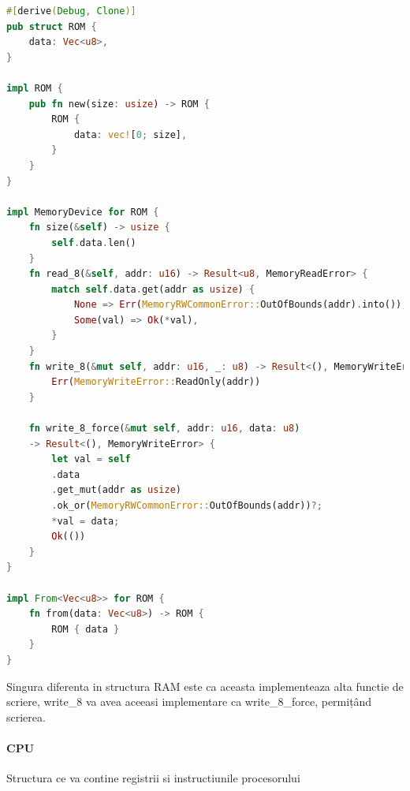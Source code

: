 \documentclass[titlepage,12pt]{article}
\DeclareRobustCommand{\code}[1]{{\ttfamily\small #1}}
\begin{document}
\begin{lstlisting}[language=Rust,caption={Structura ROM},label={lst:rom-struct}]
#[derive(Debug, Clone)]
pub struct ROM {
    data: Vec<u8>,
}

impl ROM {
    pub fn new(size: usize) -> ROM {
        ROM {
            data: vec![0; size],
        }
    }
}

impl MemoryDevice for ROM {
    fn size(&self) -> usize {
        self.data.len()
    }
    fn read_8(&self, addr: u16) -> Result<u8, MemoryReadError> {
        match self.data.get(addr as usize) {
            None => Err(MemoryRWCommonError::OutOfBounds(addr).into()),
            Some(val) => Ok(*val),
        }
    }
    fn write_8(&mut self, addr: u16, _: u8) -> Result<(), MemoryWriteError> {
        Err(MemoryWriteError::ReadOnly(addr))
    } 

    fn write_8_force(&mut self, addr: u16, data: u8) 
    -> Result<(), MemoryWriteError> {
        let val = self
        .data
        .get_mut(addr as usize)
        .ok_or(MemoryRWCommonError::OutOfBounds(addr))?;
        *val = data;
        Ok(())
    }
}

impl From<Vec<u8>> for ROM {
    fn from(data: Vec<u8>) -> ROM {
        ROM { data }
    }
}
\end{lstlisting}

Singura diferenta in structura \code{RAM} este ca aceasta implementeaza alta functie de scriere, \code{write\_8} va avea aceeasi implementare ca \code{write\_8\_force}, permițând scrierea.

\paragraph{\code{CPU}} Structura ce va contine registrii si instructiunile procesorului
\end{document}
